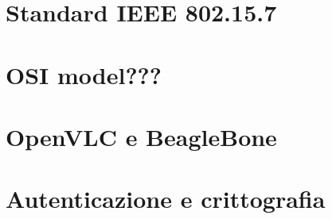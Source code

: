 \section{Standard IEEE 802.15.7}

\section{OSI model???}

\section{OpenVLC e BeagleBone}

\section{Autenticazione e crittografia}
